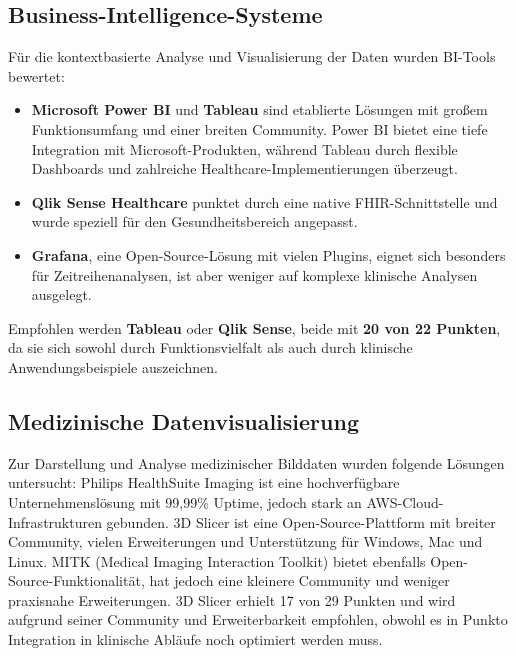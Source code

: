 \subsection{Business-Intelligence-Systeme}
Für die kontextbasierte Analyse und Visualisierung der Daten wurden BI-Tools bewertet:
\begin{itemize}
	\item \textbf{Microsoft Power BI} und \textbf{Tableau} sind etablierte Lösungen mit großem Funktionsumfang und einer breiten Community. Power BI bietet eine tiefe Integration mit Microsoft-Produkten, während Tableau durch flexible Dashboards und zahlreiche Healthcare-Implementierungen überzeugt.
	\item \textbf{Qlik Sense Healthcare} punktet durch eine native FHIR-Schnittstelle und wurde speziell für den Gesundheitsbereich angepasst.
	\item \textbf{Grafana}, eine Open-Source-Lösung mit vielen Plugins, eignet sich besonders für Zeitreihenanalysen, ist aber weniger auf komplexe klinische Analysen ausgelegt.
\end{itemize}Empfohlen werden \textbf{Tableau} oder \textbf{Qlik Sense}, beide mit \textbf{20 von 22 Punkten}, da sie sich sowohl durch Funktionsvielfalt als auch durch klinische Anwendungsbeispiele auszeichnen.

\subsection{Medizinische Datenvisualisierung}
Zur Darstellung und Analyse medizinischer Bilddaten wurden folgende Lösungen untersucht:
Philips HealthSuite Imaging ist eine hochverfügbare Unternehmenslösung mit 99,99\% Uptime, jedoch stark an AWS-Cloud-Infrastrukturen gebunden.
3D Slicer ist eine Open-Source-Plattform mit breiter Community, vielen Erweiterungen und Unterstützung für Windows, Mac und Linux.
MITK (Medical Imaging Interaction Toolkit) bietet ebenfalls Open-Source-Funktionalität, hat jedoch eine kleinere Community und weniger praxisnahe Erweiterungen.
3D Slicer erhielt 17 von 29 Punkten und wird aufgrund seiner Community und Erweiterbarkeit empfohlen, obwohl es in Punkto Integration in klinische Abläufe noch optimiert werden muss.

